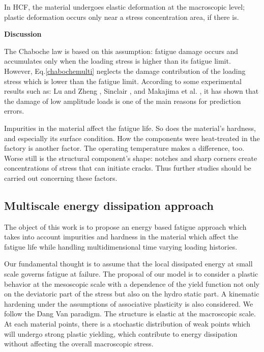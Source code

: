 \documentclass[3p,times,procedia,number]{elsarticle}
\begin{document}
In HCF, the material undergoes elastic deformation at the macroscopic level; plastic deformation occurs only near a stress concentration area, if there is.

\textbf{Discussion}

The Chaboche law is based on this assumption: fatigue damage occurs and accumulates only when the loading stress is higher than its fatigue limit. However, Eq.\eqref{chabochemulti} neglects the damage contribution of the loading stress which is lower than the fatigue
limit. According to some experimental results such as: Lu
and Zheng \cite{xi2008strengthening} \cite{xi2009strengthening} \cite{xi2009changes}, Sinclair \cite{sinclair1952investigation}, and Makajima et al. \cite{nakajima2007coaxing},
it has shown that the damage of low amplitude loads is one
of the main reasons for prediction errors. 

Impurities in the material affect the fatigue life. So does the material's hardness, and especially its surface condition. How the components were heat-treated in the factory is another factor. The operating temperature makes a difference, too. Worse still is the structural component's shape: notches and sharp corners create concentrations of stress that can initiate cracks. Thus further studies should be carried out concerning these factors.

\subsection{Multiscale energy dissipation approach}

The object of this work is to propose an energy based fatigue approach which takes into account impurities and hardness in the material which affect the fatigue life while handling multidimensional time varying loading histories.

Our fundamental thought is to assume that the local dissipated energy at small scale governs fatigue at failure. The proposal of our model is to consider a plastic behavior at the mesoscopic scale with a dependence of the yield function not only on the deviatoric part of the stress but also on the hydro static part. A kinematic hardening under the assumptions of associative plasticity is also considered. We follow the Dang Van paradigm. The structure is elastic at the macroscopic scale. At each material points, there is a stochastic distribution of weak points which will undergo strong plastic yielding, which contribute to energy dissipation without affecting the overall macroscopic stress.
\end{document}
